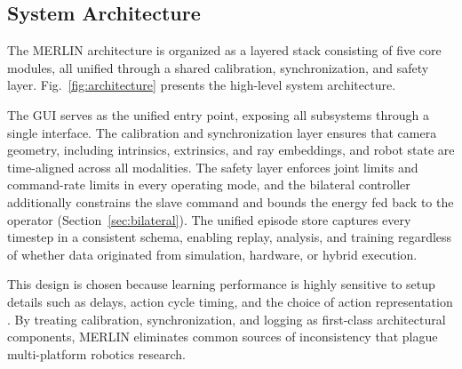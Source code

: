 \documentclass[a4paper, 10pt, conference]{ieeeconf}      %
\begin{document}
\vspace{-0.3cm}
\subsection{System Architecture}
\vspace{-0.215cm}
The MERLIN architecture is organized as a layered stack consisting of five core modules, all unified through a shared calibration, synchronization, and safety layer. Fig.~\ref{fig:architecture} presents the high-level system architecture.

The GUI serves as the unified entry point, exposing all subsystems through a single interface. The calibration and synchronization layer ensures that camera geometry, including intrinsics, extrinsics, and ray embeddings, and robot state are time-aligned across all modalities. The safety layer enforces joint limits and command-rate limits in every operating mode, and the bilateral controller additionally constrains the slave command and bounds the energy fed back to the operator (Section~\ref{sec:bilateral}). The unified episode store captures every timestep in a consistent schema, enabling replay, analysis, and training regardless of whether data originated from simulation, hardware, or hybrid execution.

This design is chosen because learning performance is highly sensitive to setup details such as delays, action cycle timing, and the choice of action representation \cite{mahmood2018senseact}. By treating calibration, synchronization, and logging as first-class architectural components, MERLIN eliminates common sources of inconsistency that plague multi-platform robotics research.
\end{document}
